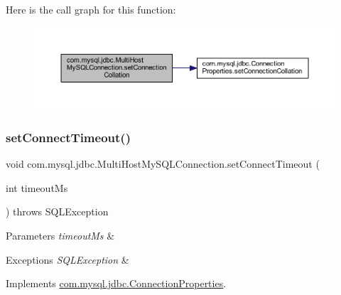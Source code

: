Here is the call graph for this function\+:
\nopagebreak
\begin{figure}[H]
\begin{center}
\leavevmode
\includegraphics[width=350pt]{classcom_1_1mysql_1_1jdbc_1_1_multi_host_my_s_q_l_connection_ac34db9416951ec25adb28a76cffe5844_cgraph}
\end{center}
\end{figure}
\mbox{\label{classcom_1_1mysql_1_1jdbc_1_1_multi_host_my_s_q_l_connection_ae1ddb08eaad091d37ab698280efcd668}} 
\subsubsection{\texorpdfstring{set\+Connect\+Timeout()}{setConnectTimeout()}}
{\footnotesize\ttfamily void com.\+mysql.\+jdbc.\+Multi\+Host\+My\+S\+Q\+L\+Connection.\+set\+Connect\+Timeout (\begin{DoxyParamCaption}\item[{int}]{timeout\+Ms }\end{DoxyParamCaption}) throws S\+Q\+L\+Exception}


\begin{DoxyParams}{Parameters}
{\em timeout\+Ms} & \\
\hline
\end{DoxyParams}

\begin{DoxyExceptions}{Exceptions}
{\em S\+Q\+L\+Exception} & \\
\hline
\end{DoxyExceptions}


Implements \mbox{\hyperlink{interfacecom_1_1mysql_1_1jdbc_1_1_connection_properties_af58263721d45c09ec3bdbccc1041e1df}{com.\+mysql.\+jdbc.\+Connection\+Properties}}.

